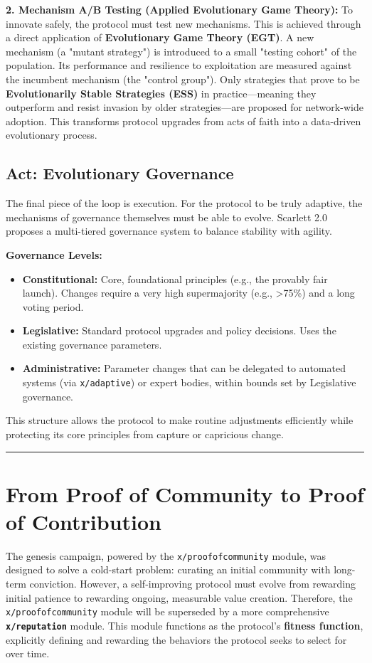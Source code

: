 \documentclass[10pt]{article}
\begin{document}
\textbf{2. Mechanism A/B Testing (Applied Evolutionary Game Theory):} To innovate safely, the protocol must test new mechanisms. This is achieved through a direct application of \textbf{Evolutionary Game Theory (EGT)}. A new mechanism (a "mutant strategy") is introduced to a small "testing cohort" of the population. Its performance and resilience to exploitation are measured against the incumbent mechanism (the "control group"). Only strategies that prove to be \textbf{Evolutionarily Stable Strategies (ESS)} in practice—meaning they outperform and resist invasion by older strategies—are proposed for network-wide adoption. This transforms protocol upgrades from acts of faith into a data-driven evolutionary process.

\subsection{Act: Evolutionary Governance}
The final piece of the loop is execution. For the protocol to be truly adaptive, the mechanisms of governance themselves must be able to evolve. Scarlett 2.0 proposes a multi-tiered governance system to balance stability with agility.

\textbf{Governance Levels:}
\begin{itemize}[leftmargin=*, itemsep=2pt]
    \item \textbf{Constitutional:} Core, foundational principles (e.g., the provably fair launch). Changes require a very high supermajority (e.g., >75\%) and a long voting period.
    \item \textbf{Legislative:} Standard protocol upgrades and policy decisions. Uses the existing governance parameters.
    \item \textbf{Administrative:} Parameter changes that can be delegated to automated systems (via \texttt{x/adaptive}) or expert bodies, within bounds set by Legislative governance.
\end{itemize}

This structure allows the protocol to make routine adjustments efficiently while protecting its core principles from capture or capricious change.

\hrule
\vspace{1em}
\section{From Proof of Community to Proof of Contribution}
The genesis campaign, powered by the \texttt{x/proofofcommunity} module, was designed to solve a cold-start problem: curating an initial community with long-term conviction. However, a self-improving protocol must evolve from rewarding initial patience to rewarding ongoing, measurable value creation. Therefore, the \texttt{x/proofofcommunity} module will be superseded by a more comprehensive \textbf{\texttt{x/reputation}} module. This module functions as the protocol's \textbf{fitness function}, explicitly defining and rewarding the behaviors the protocol seeks to select for over time.
\end{document}
